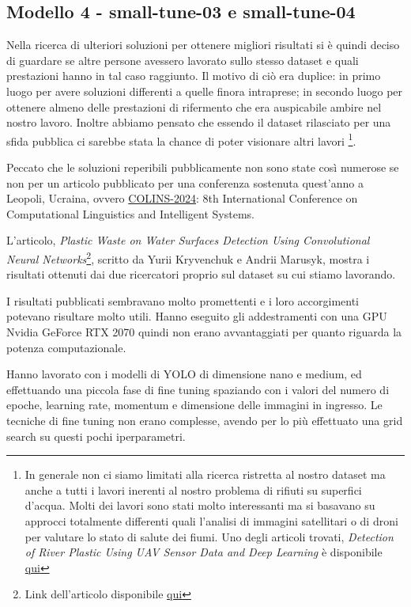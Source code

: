 \subsection*{Modello 4 - small-tune-03 e small-tune-04}


Nella ricerca di ulteriori soluzioni per ottenere migliori risultati si è quindi
deciso di guardare se altre persone avessero lavorato sullo stesso dataset e quali 
prestazioni hanno in tal caso raggiunto. Il motivo di ciò era duplice: in primo
luogo per avere soluzioni differenti a quelle finora intraprese; in secondo 
luogo per ottenere almeno delle prestazioni di rifermento che era auspicabile 
ambire nel nostro lavoro. Inoltre abbiamo pensato che essendo il dataset rilasciato 
per una sfida pubblica ci sarebbe stata la chance di poter visionare altri lavori
\footnote[2]{
In generale non ci siamo limitati alla ricerca ristretta al nostro dataset ma 
anche a tutti i lavori inerenti al nostro problema di rifiuti su superfici d'acqua.
Molti dei lavori sono stati molto interessanti ma si basavano su approcci totalmente
differenti quali l'analisi di immagini satellitari o di droni per valutare lo stato di 
salute dei fiumi. Uno degli articoli trovati, \textit{Detection of River Plastic Using UAV Sensor Data and
Deep Learning} è disponibile
\href{https://doi.org/10.3390/rs14133049}{qui}
}.

Peccato che le soluzioni reperibili pubblicamente non sono state così numerose se 
non per un articolo pubblicato per una conferenza sostenuta quest'anno a Leopoli, 
Ucraina, ovvero \href{https://ceur-ws.org/Vol-3668/}{COLINS-2024}: 8th International Conference on 
Computational Linguistics and Intelligent Systems.

L'articolo, \textit{Plastic Waste on Water Surfaces Detection Using
Convolutional Neural Networks}\footnote[3]{Link dell'articolo disponibile \href{https://ceur-ws.org/Vol-3668/paper13.pdf}{qui}},
 scritto da Yurii Kryvenchuk e Andrii Marusyk,
mostra i risultati ottenuti dai due ricercatori proprio sul dataset su cui stiamo lavorando.

I risultati pubblicati sembravano molto promettenti e i loro accorgimenti potevano risultare molto utili. 
Hanno eseguito gli addestramenti con una GPU Nvidia GeForce RTX 2070 quindi non erano avvantaggiati
per quanto riguarda la potenza computazionale. 

Hanno lavorato con i modelli di YOLO di dimensione nano e medium, ed effettuando una piccola fase di fine 
tuning spaziando con i valori del numero di epoche, learning rate, momentum e dimensione delle immagini in ingresso.
Le tecniche di fine tuning non erano complesse, avendo per lo più effettuato una grid search su questi pochi iperparametri.

